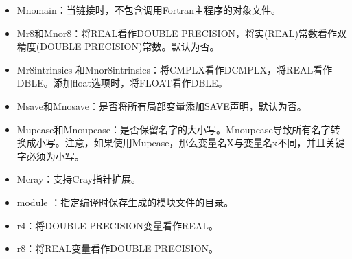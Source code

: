 \documentclass[a4paper,12pt,english]{sphinxmanual}
\begin{document}
\begin{itemize}
\item {} 
\sphinxAtStartPar
\sphinxhyphen{}Mnomain：当链接时，不包含调用Fortran主程序的对象文件。

\item {} 
\sphinxAtStartPar
\sphinxhyphen{}Mr8和\sphinxhyphen{}Mnor8：将REAL看作DOUBLE PRECISION，将实(REAL)常数看作双精度(DOUBLE PRECISION)常数。默认为否。

\item {} 
\sphinxAtStartPar
\sphinxhyphen{}Mr8intrinsics \sphinxstyleemphasis{{[}=float{]}}和\sphinxhyphen{}Mnor8intrinsics：将CMPLX看作DCMPLX，将REAL看作DBLE。添加float选项时，将FLOAT看作DBLE。

\item {} 
\sphinxAtStartPar
\sphinxhyphen{}Msave和\sphinxhyphen{}Mnosave：是否将所有局部变量添加SAVE声明，默认为否。

\item {} 
\sphinxAtStartPar
\sphinxhyphen{}Mupcase和\sphinxhyphen{}Mnoupcase：是否保留名字的大小写。\sphinxhyphen{}Mnoupcase导致所有名字转换成小写。注意，如果使用\sphinxhyphen{}Mupcase，那么变量名X与变量名x不同，并且关键字必须为小写。

\item {} 
\sphinxAtStartPar
\sphinxhyphen{}Mcray：支持Cray指针扩展。

\item {} 
\sphinxAtStartPar
\sphinxhyphen{}module ：指定编译时保存生成的模块文件的目录。

\item {} 
\sphinxAtStartPar
\sphinxhyphen{}r4：将DOUBLE PRECISION变量看作REAL。

\item {} 
\sphinxAtStartPar
\sphinxhyphen{}r8：将REAL变量看作DOUBLE PRECISION。

\end{itemize}
\end{document}
